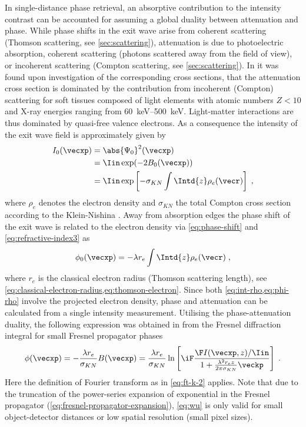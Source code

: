\documentclass[
twoside,
openright,
titlepage,
numbers=noenddot,
headinclude,
fleqn,
a4paper,
footinclude=true,
cleardoublepage=empty,
abstractoff,
BCOR=5mm,
paper=a4,
fontsize=11pt,
british,ngerman,american,
]{scrreprt}
\begin{document}
In single-distance phase retrieval, an absorptive contribution to the
intensity contrast can be accounted for assuming a global duality
between attenuation and phase.  While phase shifts in the exit wave
arise from coherent scattering (Thomson scattering, see
\cref{sec:scattering}), attenuation is due to photoelectric
absorption, coherent scattering (photons scattered away from the field
of view), or incoherent scattering (Compton scattering, see
\cref{sec:scattering}).  In \cite{Wu2005} it was found upon
investigation of the corresponding cross sections, that the
attenuation cross section is dominated by the contribution from
incoherent (Compton) scattering for soft tissues composed of light
elements with atomic numbers $Z<10$ and X-ray energies ranging from
\SIrange{60}{500}{keV}.  Light-matter interactions are thus dominated
by quasi-free valence electrons.  As a consequence the intensity of
the exit wave field is approximately given  by
\begin{equation}
  \label{eq:int-rho}
  \begin{split}
    I_0(\vecxp) 
       & = \abs{\Psi_0}^2(\vecxp) 
    \\ & = \Iin\exp(-2 B_0(\vecxp)) 
    \\ & = \Iin\exp\left[ -\sigma_{KN}\int\Intd{z}
      \rho_e(\vecr)\right] \;,
  \end{split}
\end{equation}
where $\rho_e$ denotes the electron density and $\sigma_{KN}$ the
total Compton cross section according to the Klein-Nishina 
.  Away from absorption edges the
phase shift of the exit wave is related to the electron density via
\cref{eq:phase-shift} and \cref{eq:refractive-index3} as
\begin{equation}
  \label{eq:phi-rho}
  \phi_0(\vecxp) = -\lambda r_e \int\Intd{z} \rho_e(\vecr) \;,
\end{equation}
where $r_e$ is the classical electron radius (Thomson scattering
length), see
\cref{eq:classical-electron-radius,eq:thomson-electron}. Since both
\cref{eq:int-rho,eq:phi-rho} involve the projected electron density,
phase and attenuation can be calculated from a single intensity
measurement.  Utilising the phase-attenuation duality, the following
expression was obtained in \cite{Wu2005} from the Fresnel diffraction
integral for small Fresnel propagator phases
\begin{equation}
  \label{eq:wu}
  \phi(\vecxp) = 
  -\frac{\lambda r_e }{\sigma_{KN}} B(\vecxp) =
  \frac{\lambda r_e }{\sigma_{KN}} \ln 
  \left[ \iF
    \frac{\F I(\vecxp,z)/\Iin}
    {1+\frac{\lambda^2r_e z}{2\pi\sigma_{KN}}\veckp}
  \right] \;.
\end{equation}
Here the definition of Fourier transform as in \cref{eq:ft-k-2}
applies.  Note that due to the truncation of the power-series
expansion of exponential in the Fresnel propagator
(\cref{eq:fresnel-propagator-expansion}), \cref{eq:wu} is only valid
for small object-detector distances or low spatial resolution (small
pixel sizes).
\end{document}
